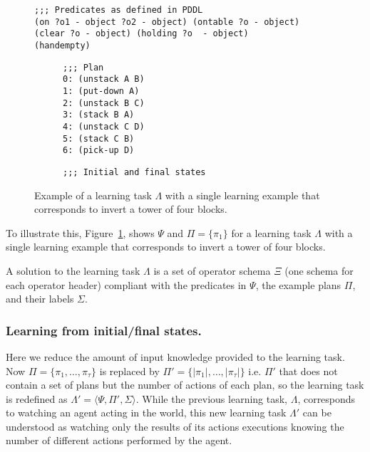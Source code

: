 \documentclass[letterpaper]{article} %
\newcommand{\tup}[1]{{\langle #1 \rangle}}
\begin{document}
\begin{figure}[hbt]
\begin{scriptsize}
\begin{verbatim}
;;; Predicates as defined in PDDL
(on ?o1 - object ?o2 - object) (ontable ?o - object) 
(clear ?o - object) (holding ?o  - object)
(handempty)
\end{verbatim}

\vspace{0.1cm}

\begin{subfigure}{.3\textwidth}
\begin{verbatim}
;;; Plan
0: (unstack A B)
1: (put-down A)
2: (unstack B C)
3: (stack B A)
4: (unstack C D)
5: (stack C B)
6: (pick-up D)
\end{verbatim}
\end{subfigure}%
\begin{subfigure}{.6\textwidth}
\begin{verbatim}
;;; Initial and final states
\end{verbatim}

\end{subfigure}%
\end{scriptsize}
 \caption{\small Example of a learning task $\Lambda$ with a single learning example that corresponds to invert a tower of four blocks.}
\label{fig:lexample}
\end{figure}

To illustrate this, Figure~\ref{fig:lexample}, shows $\Psi$ and $\Pi=\{\pi_1\}$ for a learning task $\Lambda$ with a single learning example that corresponds to invert a tower of four blocks.

A solution to the learning task $\Lambda$ is a set of operator schema $\Xi$ (one schema for each operator header) compliant with the predicates in $\Psi$, the example plans $\Pi$, and their labels $\Sigma$.

\subsubsection{Learning from initial/final states.}
Here we reduce the amount of input knowledge provided to the learning task. Now $\Pi=\{\pi_1,\ldots,\pi_{\tau}\}$ is replaced by  $\Pi'=\{|\pi_1|,\ldots,|\pi_{\tau}|\}$ i.e. $\Pi'$ that does not contain a set of plans but the number of actions of each plan, so the learning task is redefined as $\Lambda'=\tup{\Psi,\Pi',\Sigma}$. While the previous learning task, $\Lambda$, corresponds to watching an agent acting in the world, this new learning task $\Lambda'$ can be understood as watching only the results of its actions executions knowing the number of different actions performed by the agent.
\end{document}
